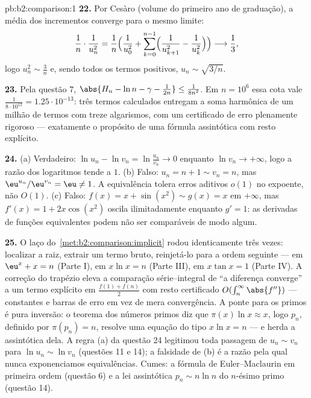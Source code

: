 \begin{solution}{pb:b2:comparison:1}
\textbf{22.} Por Cesàro (volume do primeiro ano de graduação), a média dos
incrementos converge para o mesmo limite:
\[
\frac{1}{n}\cdot\frac{1}{u_n^2}
= \frac1n\Bigl(\frac1{u_0^2} + \sum_{k=0}^{n-1}
\Bigl(\frac1{u_{k+1}^2} - \frac1{u_k^2}\Bigr)\Bigr)
\longrightarrow \frac13 ,
\]
logo $u_n^2 \sim \frac3n$ e, sendo todos os termos positivos, $u_n
\sim \sqrt{3/n}$.

\textbf{23.} Pela questão 7, $\abs{H_n - \ln n - \gamma -
\frac1{2n}} \leq \frac1{8n^2}$. Em $n = 10^6$ essa cota vale
$\frac{1}{8\cdot10^{12}} = 1.25\cdot10^{-13}$: três termos calculados
entregam a soma harmônica de um milhão de termos com treze
algarismos, com um certificado de erro plenamente rigoroso --- exatamente
o propósito de uma fórmula assintótica com resto explícito.

\textbf{24.} (a) Verdadeiro: $\ln u_n - \ln v_n = \ln\frac{u_n}{v_n}
\to 0$ enquanto $\ln v_n \to +\infty$, logo a razão dos logaritmos
tende a $1$. (b) Falso: $u_n = n + 1 \sim v_n = n$, mas
$\eu^{u_n}/\eu^{v_n} = \eu \neq 1$. A equivalência tolera
erros aditivos $o(1)$ no expoente, não $O(1)$. (c) Falso:
$f(x) = x + \sin(x^2) \sim g(x) = x$ em $+\infty$, mas $f'(x)
= 1 + 2x\cos(x^2)$ oscila ilimitadamente enquanto $g' = 1$:
as derivadas de funções equivalentes podem não ser comparáveis de
modo algum.

\textbf{25.} O laço do~\cref{met:b2:comparison:implicit} rodou
identicamente três vezes: localizar a raiz, extrair um termo
bruto, reinjetá-lo para a ordem seguinte --- em $\eu^x + x = n$
(Parte I), em $x\ln x = n$ (Parte III), em $x\tan x = 1$ (Parte
IV). A correção do trapézio eleva a comparação série--integral
de ``a diferença converge'' a um termo explícito em
$\frac{f(1) + f(n)}2$ com resto certificado $O(\int_n^\infty
\abs{f''})$ --- constantes e barras de erro em vez de
mera convergência. A ponte para os primos é pura inversão: o
teorema dos números primos diz que $\pi(x)\ln x \approx x$, logo $p_n$,
definido por $\pi(p_n) = n$, resolve uma equação do tipo $x\ln x = n$ ---
e herda a assintótica dela. A regra (a) da questão 24
legitimou toda passagem de $u_n \sim v_n$ para $\ln u_n \sim
\ln v_n$ (questões 11 e 14); a falsidade de (b) é a razão pela qual
nunca exponenciamos equivalências. Cumes: a fórmula de Euler--Maclaurin
em primeira ordem (questão 6) e a lei assintótica
$p_n \sim n\ln n$ do $n$-ésimo primo (questão 14).
\end{solution}
